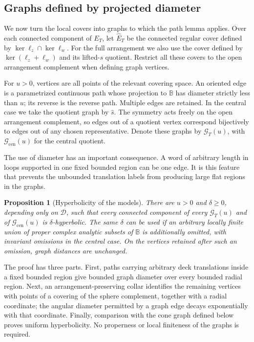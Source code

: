 \documentclass[11pt,reqno]{amsart}
\numberwithin{equation}{section}
\newtheorem{proposition}[theorem]{Proposition}
\theoremstyle{definition}
\theoremstyle{remark}
\begin{document}
\subsection{Graphs defined by projected diameter}

We now turn the local covers into graphs to which the path lemma
applies.  Over each connected component of $E_T$, let
$\widehat E_T$ be the connected regular cover defined by
$\ker\ell_z\cap\ker\ell_w$.  For the full arrangement we also use
the cover defined by $\ker(\ell_z+\ell_w)$ and its lifted-$s$
quotient.  Restrict all these covers to the open arrangement
complement when defining graph vertices.

For $u>0$, vertices are all points of the relevant covering space.
An oriented edge is a parametrized continuous path whose projection
to $\mathbb B$ has diameter strictly less than $u$; its reverse is the
reverse path.  Multiple edges are retained.  In the central case
we take the quotient graph by $\widehat s$.  The symmetry acts
freely on the open arrangement complement, so edges out of a
quotient vertex correspond bijectively to edges out of any chosen
representative.  Denote these graphs by $\mathcal G_T(u)$, with
$\mathcal G_{\mathrm{cen}}(u)$ for the central quotient.

The use of diameter has an important consequence.  A word of
arbitrary length in loops supported in one fixed bounded region
can be one edge.  It is this feature that prevents the unbounded
translation labels from producing large flat regions in the
graphs.

\begin{proposition}[Hyperbolicity of the models]\label{prop:model-hyperbolicity}
There are $u>0$ and $\delta\ge0$, depending only on $\mathcal D$, such that
every connected component of every $\mathcal G_T(u)$ and of
$\mathcal G_{\mathrm{cen}}(u)$ is $\delta$-hyperbolic.
The same $\delta$ can be used if an arbitrary locally finite union
of proper complex analytic subsets of $\mathbb B$ is additionally
omitted, with invariant omissions in the central case.  On the
vertices retained after such an omission, graph distances are
unchanged.
\end{proposition}

The proof has three parts.  First, paths carrying arbitrary deck
translations inside a fixed bounded region give bounded graph diameter
over every bounded radial region.  Next, an arrangement-preserving
collar identifies the remaining vertices with points of a covering of
the sphere complement, together with a radial coordinate; the angular
diameter permitted by a graph edge decays exponentially with that
coordinate.  Finally, comparison with the cone graph defined below
proves uniform hyperbolicity.  No properness or local finiteness of the
graphs is required.
\end{document}
